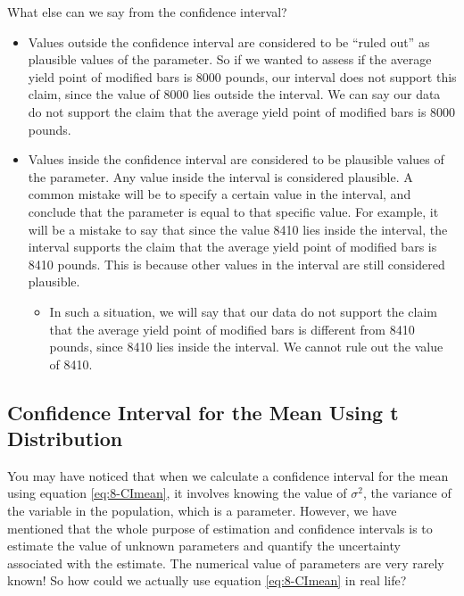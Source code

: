 \documentclass[
]{book}
\providecommand{\tightlist}{%
  \setlength{\itemsep}{0pt}\setlength{\parskip}{0pt}}
\begin{document}
What else can we say from the confidence interval?

\begin{itemize}
\item
  Values outside the confidence interval are considered to be ``ruled out'' as plausible values of the parameter. So if we wanted to assess if the average yield point of modified bars is 8000 pounds, our interval does not support this claim, since the value of 8000 lies outside the interval. We can say our data do not support the claim that the average yield point of modified bars is 8000 pounds.
\item
  Values inside the confidence interval are considered to be plausible values of the parameter. Any value inside the interval is considered plausible. A common mistake will be to specify a certain value in the interval, and conclude that the parameter is equal to that specific value. For example, it will be a mistake to say that since the value 8410 lies inside the interval, the interval supports the claim that the average yield point of modified bars is 8410 pounds. This is because other values in the interval are still considered plausible.

  \begin{itemize}
  \tightlist
  \item
    In such a situation, we will say that our data do not support the claim that the average yield point of modified bars is different from 8410 pounds, since 8410 lies inside the interval. We cannot rule out the value of 8410.
  \end{itemize}
\end{itemize}

\hypertarget{CImeant}{%
\subsection{Confidence Interval for the Mean Using t Distribution}\label{CImeant}}

You may have noticed that when we calculate a confidence interval for the mean using equation \eqref{eq:8-CImean}, it involves knowing the value of \(\sigma^2\), the variance of the variable in the population, which is a parameter. However, we have mentioned that the whole purpose of estimation and confidence intervals is to estimate the value of unknown parameters and quantify the uncertainty associated with the estimate. The numerical value of parameters are very rarely known! So how could we actually use equation \eqref{eq:8-CImean} in real life?
\end{document}
